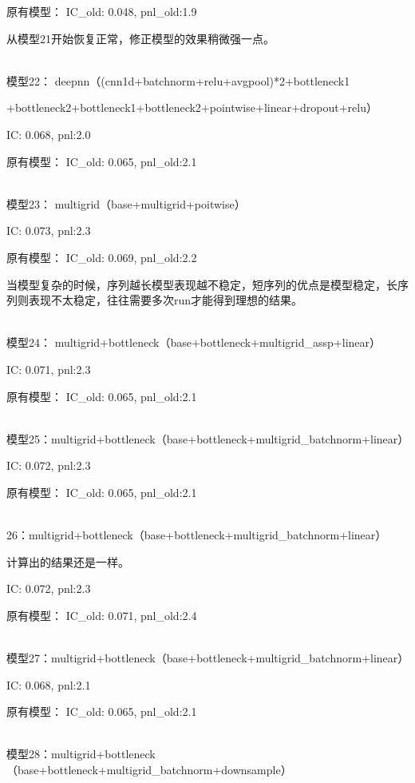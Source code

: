 \documentclass[11pt]{ctexart}
\begin{document}
原有模型：
{\kaishu \small IC\_old: 0.048, pnl\_old:1.9}

从模型21开始恢复正常，修正模型的效果稍微强一点。

~\\
模型22： deepnn（(cnn1d+batchnorm+relu+avgpool)*2+bottleneck1

+bottleneck2+bottleneck1+bottleneck2+pointwise+linear+dropout+relu）

{\kaishu \small IC: 0.068, pnl:2.0}

原有模型：
{\kaishu \small IC\_old: 0.065, pnl\_old:2.1}

~\\
模型23： multigrid（base+multigrid+poitwise）

{\kaishu \small IC: 0.073, pnl:2.3}

原有模型：
{\kaishu \small IC\_old: 0.069, pnl\_old:2.2}

当模型复杂的时候，序列越长模型表现越不稳定，短序列的优点是模型稳定，长序列则表现不太稳定，往往需要多次run才能得到理想的结果。

~\\
模型24： multigrid+bottleneck（base+bottleneck+multigrid\_assp+linear）

{\kaishu \small IC: 0.071, pnl:2.3}

原有模型：
{\kaishu \small IC\_old: 0.065, pnl\_old:2.1}

~\\
模型25：multigrid+bottleneck（base+bottleneck+multigrid\_batchnorm+linear）

{\kaishu \small IC: 0.072, pnl:2.3}

原有模型：
{\kaishu \small IC\_old: 0.065, pnl\_old:2.1}

~\\26：multigrid+bottleneck（base+bottleneck+multigrid\_batchnorm+linear）

计算出的结果还是一样。

{\kaishu \small IC: 0.072, pnl:2.3}

原有模型：
{\kaishu \small IC\_old: 0.071, pnl\_old:2.4}

~\\
模型27：multigrid+bottleneck（base+bottleneck+multigrid\_batchnorm+linear）

{\kaishu \small IC: 0.068, pnl:2.1}

原有模型：
{\kaishu \small IC\_old: 0.065, pnl\_old:2.1}

~\\
模型28：multigrid+bottleneck（base+bottleneck+multigrid\_batchnorm+downsample）
\end{document}
